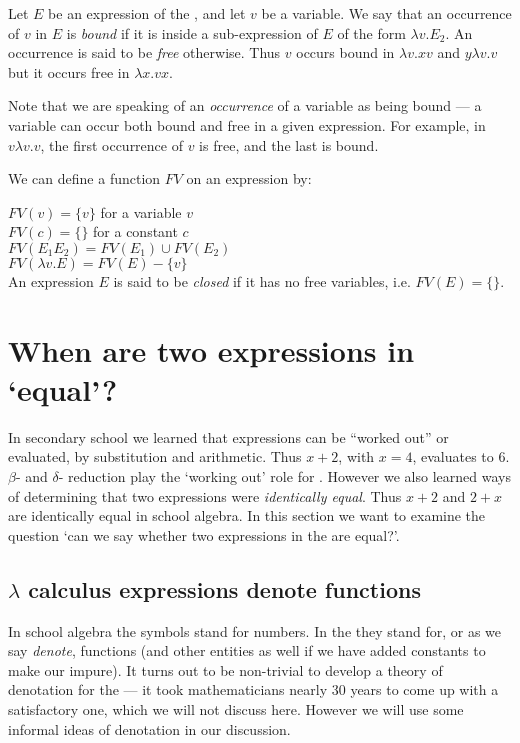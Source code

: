Let $E$ be an expression of the \LC, and let $v$ be a variable. We say that
an occurrence of $v$ in $E$ is {\em bound} if it is inside a sub-expression
of $E$ of the form $\lambda v.E_2$.  An occurrence is said to be {\em free}
otherwise. Thus  $v$ occurs bound in  $\lambda v. x v$ and $y \lambda v. v$
but it occurs free in $\lambda x. v x$.



Note that we are speaking of an {\em occurrence} of a variable as being
bound --- a variable can occur both bound and free in a given
expression. For example, in   $v \lambda v. v$, the first occurrence of $v$
is free, and the last is bound.

We can define a function $FV$ on an expression by:

$FV(v) = \{v\}$  for a variable $v$\\
$FV(c) = \{\}$    for a constant $c$\\
$FV(E_1E_2) = FV(E_1)\cup FV(E_2)$ \\
$FV(\lambda v .E) = FV(E) - \{v\}$\\

An expression $E$ is said to be {\em closed} if it has no free variables,
i.e. $FV(E) = \{\}$.


\section {When are two expressions in \LC `equal'?}

In secondary school we learned that expressions can be ``worked out'' or
evaluated, by substitution and arithmetic. Thus $x+2$, with $x=4$,
evaluates to $6$. $\beta$- and $\delta$- reduction play the `working out'
role for \LC. However we also learned ways of determining that two
expressions were {\em identically equal}. Thus  $x+2$ and $2+x$ are
identically equal in school algebra. In this section we want to examine the
question `can we say whether two expressions in the \LC are equal?'.

\subsection{$\lambda$ calculus expressions denote functions}
In school algebra the symbols stand for numbers. In the  \LC
they stand for, or as we say {\em denote}, functions (and other entities as
well if we have added constants to make our \LC impure). It turns out to be
non-trivial to develop a theory of denotation for the \LC --- it took
mathematicians nearly 30 years to come up with a satisfactory one, which we
will not discuss here. However we will use some informal ideas of
denotation in our discussion.


